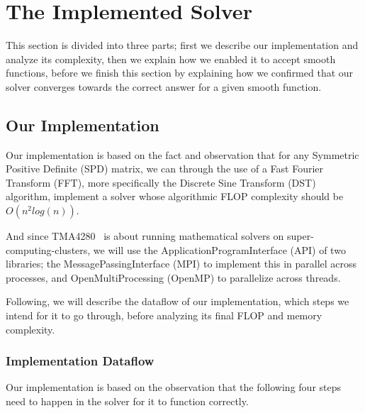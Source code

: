 \documentclass[fontsize=11pt,paper=a4,titlepage]{article}
\begin{document}
\section{The Implemented Solver}

This section is divided into three parts; first we describe our implementation
and analyze its complexity, then we explain how we enabled it to accept smooth
functions, before we finish this section by explaining how we confirmed that our
solver converges towards the correct answer for a given smooth function.

\subsection{Our Implementation}
\label{sec:Impl}

Our implementation is based on the fact and observation that for any Symmetric
Positive Definite (SPD) matrix, we can through the use of a Fast Fourier
Transform (FFT), more specifically the Discrete Sine Transform (DST)
algorithm, implement a solver whose algorithmic FLOP complexity should be
$\textit{O}(n^2log(n))$.

And since TMA4280~\cite{tma4280} is about running mathematical solvers on
super-computing-clusters, we will use the ApplicationProgramInterface (API)
of two libraries; the MessagePassingInterface (MPI) to implement this in
parallel across processes, and OpenMultiProcessing (OpenMP) to parallelize
across threads.

Following, we will describe the dataflow of our implementation, which steps we
intend for it to go through, before analyzing its final FLOP and memory
complexity.

\subsubsection{Implementation Dataflow}
\label{sssec:dataflow}

Our implementation is based on the observation that the following four steps
need to happen in the solver for it to function correctly.
\end{document}
